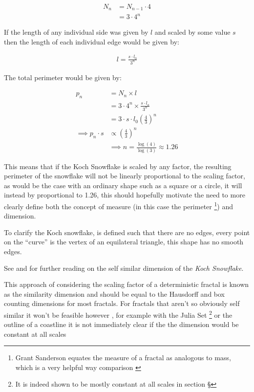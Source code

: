 \documentclass[a4paper,11pt,twoside]{article}
\begin{document}
\begin{align}
N_{n} &= N_{n-1} \cdot 4 \\
&= 3 \cdot 4^{n}
\end{align}

If the length of any individual side was given by \(l\) and scaled by some value \(s\) then the length of each individual edge would be given by:

\begin{align}
l = \frac{s \cdot l_{0}}{3^{n}}
\end{align}

The total perimeter would be given by:

\begin{align}
p_{n} &= N_{n} \times l \\
&= 3\cdot 4^{n} \times \frac{s \cdot l_{o}}{3^{n}} \\
&= 3 \cdot s \cdot  l_{0} \left( \frac{4}{3} \right)^{n}\\
 \implies p_{n} \cdot s & \propto \left(\frac{4}{3}\right)^{n}\\
& \implies  n = \frac{\log\left( 4 \right)}{\log\left( 3 \right)} \approx 1.26 \label{eq:koch-dim}
\end{align}

This means that if the Koch Snowflake is scaled by any factor, the resulting perimeter of the snowflake will not be linearly proportional to the scaling factor, as would be the case with an ordinary shape such as a square or a circle, it will instead by proportional to 1.26, this should hopefully motivate the need to more clearly define both the concept of measure (in this case the perimeter \footnote{Grant Sanderson equates the measure of a fractal as analogous to mass, which is a very helpful way comparison \cite{sandersonFractalsAreTypically2017}}) and dimension.

To clarify the Koch snowflake, is defined such that there are no edges, every point on the ``curve'' is the vertex of an equilateral triangle, this shape has no smooth edges.

See \cite[p. 414]{strogatzNonlinearDynamicsChaos2015} and \cite[\S 5.4]{baderSpacefillingCurvesIntroduction2013} for further reading on the self similar dimension of the \emph{Koch Snowflake}.

This approach of considering the scaling factor of a deterministic fractal is
known as the similarity dimension \cite[p.
413]{strogatzNonlinearDynamicsChaos2015} and should be equal to the Hausdorff and box counting dimensions for most
fractals. For fractals that aren't so obviously self similar it won't be
feasible however \cite[p. 393]{liIntegrationFuzzyLogic2006}, for example with
the Julia Set \footnote{It is indeed shown to be
mostly constant at all scales in section \S} or the outline of a coastline it is not immediately clear if the
the dimension would be constant at all scales
\end{document}
